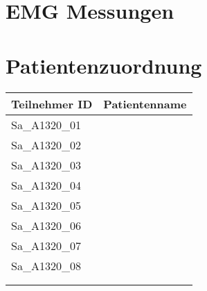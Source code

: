 \documentclass{article}
\begin{document}
\section*{EMG Messungen}
\vspace{1cm}
\section*{Patientenzuordnung}


\begin{center}
  \begin{tabular}{  p{} | p{}   }
    \textbf{Teilnehmer ID}  & \textbf{Patientenname}\\ \hline
	Sa\_A1320\_01 & \\ \hline
	Sa\_A1320\_02 & \\ \hline	
	Sa\_A1320\_03 & \\ \hline 
	Sa\_A1320\_04 & \\ \hline
	Sa\_A1320\_05 & \\ \hline
	Sa\_A1320\_06 & \\ \hline
	Sa\_A1320\_07 & \\ \hline		   
	Sa\_A1320\_08 & \\ \hline
	 & \\ \hline	
	 & \\ \hline
    
  \end{tabular}
\end{center}
\end{document}
